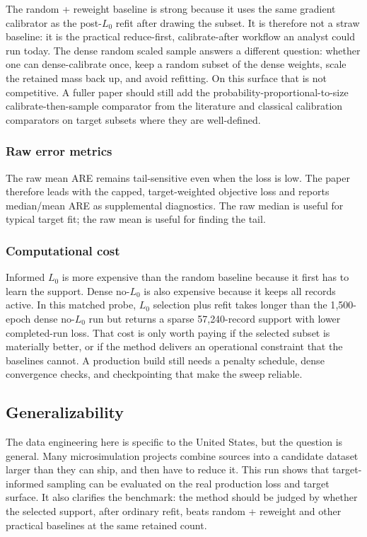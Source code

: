 The random + reweight baseline is strong because it uses the same gradient calibrator as the post-$L_0$
refit after drawing the subset. It is therefore not a straw baseline: it is the practical reduce-first,
calibrate-after workflow an analyst could run today. The dense random scaled sample answers a different
question: whether one can dense-calibrate once, keep a random subset of the dense weights, scale the
retained mass back up, and avoid refitting. On this surface that is not competitive. A fuller paper should
still add the probability-proportional-to-size calibrate-then-sample comparator from the literature and
classical calibration comparators on target subsets where they are well-defined.

\subsubsection{Raw error metrics}

The raw mean ARE remains tail-sensitive even when the \populace{} loss is low. The paper therefore leads with
the capped, target-weighted \populace{} objective loss and reports median/mean ARE as supplemental
diagnostics. The raw median is useful for typical target fit; the raw mean is useful for finding the tail.

\subsubsection{Computational cost}

Informed $L_0$ is more expensive than the random baseline because it first has to learn the support. Dense
no-$L_0$ is also expensive because it keeps all records active. In this matched probe, $L_0$ selection plus
refit takes longer than the 1{,}500-epoch dense no-$L_0$ run but returns a sparse 57{,}240-record support
with lower completed-run loss. That cost is only worth paying if the selected subset is materially better,
or if the method delivers an operational constraint that the baselines cannot. A production build still
needs a penalty schedule, dense convergence checks, and checkpointing that make the sweep reliable.

\subsection{Generalizability}

The data engineering here is specific to the United States, but the question is general. Many
microsimulation projects combine sources into a candidate dataset larger than they can ship, and then have
to reduce it. This run shows that target-informed sampling can be evaluated on the real production loss and
target surface. It also clarifies the benchmark: the method should be judged by whether the selected
support, after ordinary refit, beats random + reweight and other practical baselines at the same retained
count.
